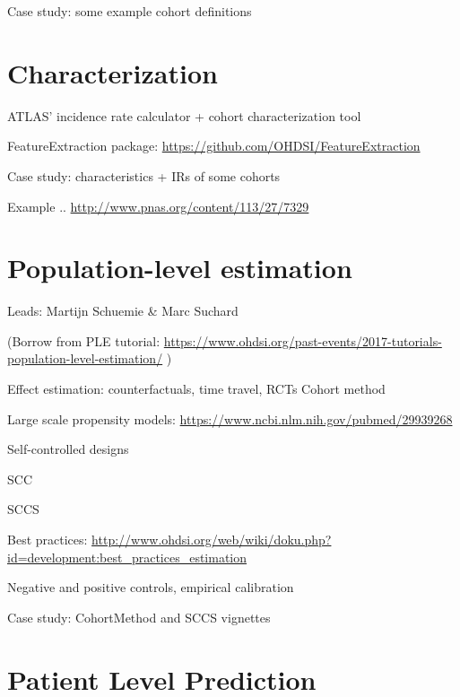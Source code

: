 \documentclass[]{book}
\begin{document}
Case study: some example cohort definitions

\chapter{Characterization}\label{Characterization}

ATLAS' incidence rate calculator + cohort characterization tool

FeatureExtraction package:
\url{https://github.com/OHDSI/FeatureExtraction}

Case study: characteristics + IRs of some cohorts

Example .. \url{http://www.pnas.org/content/113/27/7329}

\chapter{Population-level estimation}\label{PopulationLevelEstimation}

Leads: Martijn Schuemie \& Marc Suchard

(Borrow from PLE tutorial:
\url{https://www.ohdsi.org/past-events/2017-tutorials-population-level-estimation/}
)

Effect estimation: counterfactuals, time travel, RCTs Cohort method

Large scale propensity models:
\url{https://www.ncbi.nlm.nih.gov/pubmed/29939268}

Self-controlled designs

SCC

SCCS

Best practices:
\url{http://www.ohdsi.org/web/wiki/doku.php?id=development:best_practices_estimation}

Negative and positive controls, empirical calibration

Case study: CohortMethod and SCCS vignettes

\chapter{Patient Level Prediction}\label{PatientLevelPrediction}
\end{document}

